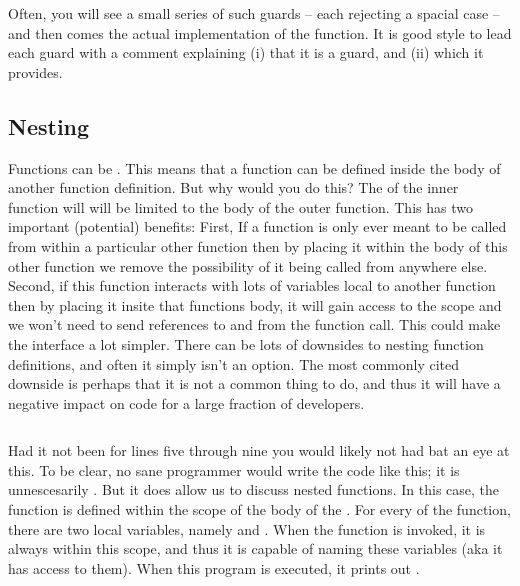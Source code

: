 Often, you will see a small series of such guards -- each rejecting a spacial case -- and then comes the actual implementation of the function. It is good style to lead each guard with a comment explaining (i) that it is a guard, and (ii) which  it provides.

\subsection{Nesting}

Functions can be . This means that a function can be defined inside the body of another function definition. But why would you do this? The  of the inner function will will be limited to the body of the outer function. This has two important (potential) benefits: First, If a function is only ever meant to be called from within a particular other function then by placing it within the body of this other function we remove the possibility of it being called from anywhere else. Second, if this function interacts with lots of variables local to another function then by placing it insite that functions body, it will gain access to the  scope and we won't need to send references to and from the function call. This could make the interface a lot simpler. There can be lots of downsides to nesting function definitions, and often it simply isn't an option. The most commonly cited downside is perhaps that it is not a common thing to do, and thus it will have a negative impact on code  for a large fraction of developers.

\inputminted[linenos=true]{csharp}{../src/csharp/functions/nesting/Program.cs}

Had it not been for lines five through nine you would likely not had bat an eye at this. To be clear, no sane programmer would write the code like this; it is unnescesarily . But it does allow us to discuss nested functions. In this case, the  function is defined within the scope of the body of the . For every  of the  function, there are two local variables, namely  and . When the  function is invoked, it is always within this scope, and thus it is capable of naming these variables (aka it has access to them). When this program is executed, it prints out .

